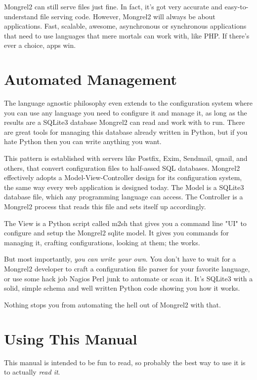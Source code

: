 Mongrel2 can still serve files just fine.  In fact, it's got very accurate and
easy-to-understand file serving code.  However, Mongrel2 will always be about applications.
Fast, scalable, awesome, asynchronous or synchronous applications that need to use languages
that mere mortals can work with, like PHP.  If there's ever a choice, apps win.

\section{Automated Management}

The language agnostic philosophy even extends to the configuration system where
you can use any language you need to configure it and manage it, as long as the
results are a SQLite3 database Mongrel2 can read and work with to run.  There are
great tools for managing this database already written in Python, but if you hate
Python then you can write anything you want.

This pattern is established with servers like Postfix, Exim, Sendmail, qmail,
and others, that convert configuration files to half-assed SQL databases.
Mongrel2 effectively adopts a Model-View-Controller design for its
configuration system, the same way every web application is designed today.
The Model is a SQLite3 database file, which any programming language can access.
The Controller is a Mongrel2 process that reads this file and sets itself up
accordingly.

The View is a Python script called m2sh that gives you a command line "UI" to
configure and setup the Mongrel2 sqlite model.  It gives you commands for
managing it, crafting configurations, looking at them; the works.

But most importantly, \emph{you can write your own}.  You don't have to wait
for a Mongrel2 developer to craft a configuration file parser for your favorite
language, or use some hack job Nagios Perl junk to automate or scan it.  It's
SQLite3 with a solid, simple schema and well written Python code showing you how
it works.

Nothing stops you from automating the hell out of Mongrel2 with that.


\section{Using This Manual}

This manual is intended to be fun to read, so probably the best way to use it
is to actually \emph{read it}.

